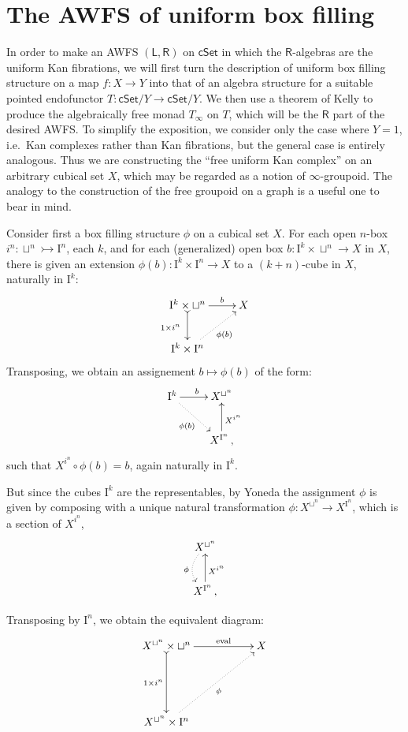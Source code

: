 \documentclass[12pt]{article}
\newcommand{\cSet}{\ensuremath{\mathsf{cSet}}}
\newcommand{\LL}{\ensuremath{\mathsf{L}}}
\newcommand{\RR}{\ensuremath{\mathsf{R}}}
\newcommand{\eval}{\ensuremath{\mathrm{eval}}}
\newcommand{\mono}{\ensuremath{\rightarrowtail}}
\newcommand{\I}{\ensuremath{\mathrm{I}}}
\theoremstyle{remark}
\theoremstyle{definition}
\begin{document}
\section{The AWFS of uniform box filling}


In order to make an AWFS $(\LL,\RR)$ on $\cSet$ in which the $\RR$-algebras are the uniform Kan fibrations, we will first turn the description of uniform box filling structure on a map $f : X\to Y$ into that of an algebra structure for a suitable pointed endofunctor $T : \cSet/Y\to\cSet/Y$.  We then use a theorem of Kelly \cite{Kelly} to produce the algebraically free monad $T_\infty$ on $T$, which will be the $\RR$ part of the desired AWFS.  To simplify the exposition, we consider only the case where $Y=1$, i.e.\ Kan complexes rather than Kan fibrations, but the general case is entirely analogous.  Thus we are constructing the ``free uniform Kan complex'' on an arbitrary cubical set $X$, which may be regarded as a notion of $\infty$-groupoid.  The analogy to the construction of the free groupoid on a graph is a useful one to bear in mind.

Consider first a box filling structure $\phi$ on a cubical set $X$.  For each open $n$-box $i^n:\sqcup^n \mono \I^n$, each $k$, and for each (generalized) open box $b: \I^k \times\sqcup^n\to X$ in $X$, there is given an extension $\phi(b) : \I^k\times\I^n \to X$ to a $(k+n)$-cube in $X$, naturally in $\I^k$:
\[
\xymatrix{
\I^k\times \sqcup^n\ar@{>->}[d]_{1\times i^n\ } \ar[r]^-{b}  & X\\
 \I^k \times \I^n \ar@{..>}[ru]_{\phi(b)} &
}
\]
Transposing, we obtain an assignement $b \mapsto \phi(b)$ of the form:
\[
\xymatrix{
\I^k \ar[r]^{b}  \ar@{..>}[rd]_{\phi(b)}  & X^{ \sqcup^n}\\
 & \ar[u]_{X^{i^n}}  X^{ \I^n}\,,
}
\]
such that $X^{i^n}\circ\phi(b) = b$, again naturally in $\I^k$.

But since the cubes $\I^k$ are the representables, by Yoneda the assignment $\phi$ is given by composing with a unique natural transformation $\phi : X^{\sqcup^n}\to X^{\I^n}$, which is a section of $X^{i^n}$,
\[
\xymatrix{
  \ar@/{}_{1pc}/@{..>}[d]_{\phi} X^{ \sqcup^n}\\
  \ar[u]_{X^{i^n}}  X^{ \I^n}\,,
}
\]

Transposing by $\I^n$, we obtain the equivalent diagram:
\[
\xymatrix{
 X^{\sqcup^n}\times\sqcup^n \ar@{>->}[dd]_-{1\times i^n} \ar[rr]^-{\eval} && X \\
&& \\
 X^{\sqcup^n}\times\I^n \ar@{..>}[uurr]_{\phi} &&
}
\]
\end{document}
